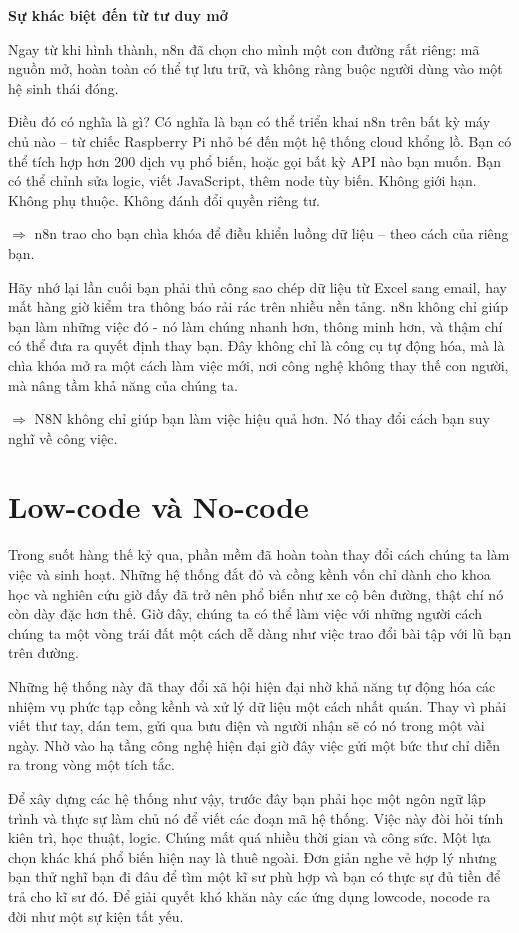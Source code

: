 \textbf{Sự khác biệt đến từ tư duy mở}

Ngay từ khi hình thành, n8n đã chọn cho mình một con đường rất riêng: mã nguồn mở, hoàn toàn có thể tự lưu trữ, và không ràng buộc người dùng vào một hệ sinh thái đóng.

Điều đó có nghĩa là gì? Có nghĩa là bạn có thể triển khai n8n trên bất kỳ máy chủ nào – từ chiếc Raspberry Pi nhỏ bé đến một hệ thống cloud khổng lồ. Bạn có thể tích hợp hơn 200 dịch vụ phổ biến, hoặc gọi bất kỳ API nào bạn muốn. Bạn có thể chỉnh sửa logic, viết JavaScript, thêm node tùy biến. Không giới hạn. Không phụ thuộc. Không đánh đổi quyền riêng tư.

$\Rightarrow$ n8n trao cho bạn chìa khóa để điều khiển luồng dữ liệu – theo cách của riêng bạn.

Hãy nhớ lại lần cuối bạn phải thủ công sao chép dữ liệu từ Excel sang email, hay mất hàng giờ kiểm tra thông báo rải rác trên nhiều nền tảng. n8n không chỉ giúp bạn làm những việc đó - nó làm chúng nhanh hơn, thông minh hơn, và thậm chí có thể đưa ra quyết định thay bạn. Đây không chỉ là công cụ tự động hóa, mà là chìa khóa mở ra một cách làm việc mới, nơi công nghệ không thay thế con người, mà nâng tầm khả năng của chúng ta.

$\Rightarrow$ N8N không chỉ giúp bạn làm việc hiệu quả hơn. Nó thay đổi cách bạn suy nghĩ về công việc.
        
\newpage
\section{Low-code và No-code}
Trong suốt hàng thế kỷ qua, phần mềm đã hoàn toàn thay đổi cách chúng ta làm việc và sinh hoạt. Những hệ thống đắt đỏ và cồng kềnh vốn chỉ dành cho khoa học và nghiên cứu giờ đấy đã trở nên phổ biến như xe cộ bên đường, thật chí nó còn dày đặc hơn thế. Giờ đây, chúng ta có thể làm việc với những người cách chúng ta một vòng trái đất một cách dễ dàng như việc trao đổi bài tập với lũ bạn trên đường. 

Những hệ thống này đã thay đổi xã hội hiện đại nhờ khả năng tự động hóa các nhiệm vụ phức tạp cồng kềnh và xử lý dữ liệu một cách nhất quán. Thay vì phải viết thư tay, dán tem, gửi qua bưu điện và người nhận sẽ có nó trong một vài ngày. Nhờ vào hạ tầng công nghệ hiện đại giờ đây việc gửi một bức thư chỉ diễn ra trong vòng một tích tắc.


Để xây dựng các hệ thống như vậy, trước đây bạn phải học một ngôn ngữ lập trình và thực sự làm chủ nó để viết các đoạn mã hệ thống. Việc này đòi hỏi tính kiên trì, học thuật, logic. Chúng mất quá nhiều thời gian và công sức. Một lựa chọn khác khá phổ biến hiện nay là thuê ngoài. Đơn giản nghe vẻ hợp lý nhưng bạn thử nghĩ bạn đi đâu để tìm một kĩ sư phù hợp và bạn có thực sự đủ tiền để trả cho kĩ sư đó. Để giải quyết khó khăn này các ứng dụng lowcode, nocode ra đời như một sự kiện tất yếu.

